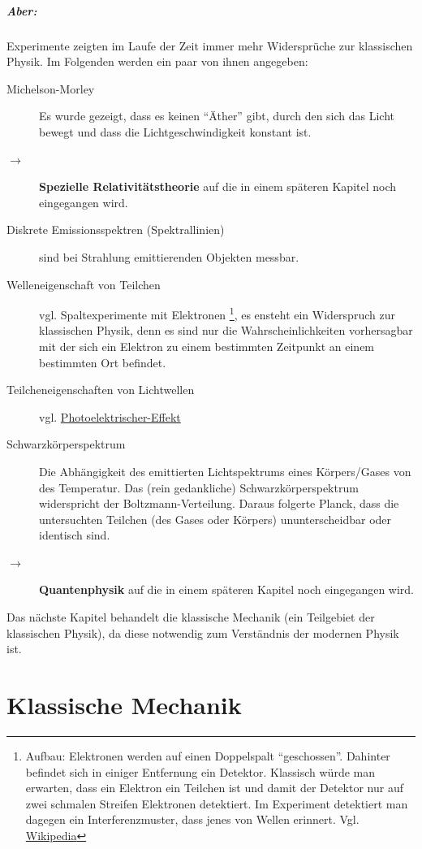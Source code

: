 \documentclass[oneside]{book}
\theoremstyle{definition}
\newcommand{\conseq}{$\rightarrow$~}
\begin{document}
\paragraph{Aber:} Experimente zeigten im Laufe der Zeit immer mehr Widersprüche zur klassischen Physik. Im Folgenden werden ein paar von ihnen angegeben:
\begin{description}
	\item[Michelson-Morley] Es wurde gezeigt, dass es keinen "`Äther"' gibt, durch den sich das Licht bewegt und dass die Lichtgeschwindigkeit konstant ist.
	\item[\conseq] \textbf{Spezielle Relativitätstheorie} auf die in einem späteren Kapitel noch eingegangen wird.
	\item[Diskrete Emissionsspektren (Spektrallinien)] sind bei Strahlung emittierenden Objekten messbar.
	\item[Welleneigenschaft von Teilchen] vgl. Spaltexperimente mit Elektronen \footnote{Aufbau: Elektronen werden auf einen Doppelspalt "`geschossen"'. Dahinter befindet sich in einiger Entfernung ein Detektor. Klassisch würde man erwarten, dass ein Elektron ein Teilchen ist und damit der Detektor nur auf zwei schmalen Streifen Elektronen detektiert. Im Experiment detektiert man dagegen ein Interferenzmuster, dass jenes von Wellen erinnert. Vgl. \href{http://de.wikipedia.org/wiki/Doppelspaltexperiment}{Wikipedia}}, es ensteht ein Widerspruch zur klassischen Physik, denn es sind nur die Wahrscheinlichkeiten vorhersagbar mit der sich ein Elektron zu einem bestimmten Zeitpunkt an einem bestimmten Ort befindet.
	\item[Teilcheneigenschaften von Lichtwellen] vgl. \href{http://de.wikipedia.org/wiki/Photoelektrischer_Effekt}{Photoelektrischer-Effekt}
	\item[Schwarzkörperspektrum] Die Abhängigkeit des emittierten Lichtspektrums eines Körpers/Gases von des Temperatur. Das (rein gedankliche) Schwarzkörperspektrum widerspricht der Boltzmann-Verteilung. Daraus folgerte Planck, dass die untersuchten Teilchen (des Gases oder Körpers) ununterscheidbar oder identisch sind.
	\item[\conseq] \textbf{Quantenphysik} auf die in einem späteren Kapitel noch eingegangen wird.
\end{description}
Das nächste Kapitel behandelt die klassische Mechanik (ein Teilgebiet der klassischen Physik), da diese notwendig zum Verständnis der modernen Physik ist.

\chapter{Klassische Mechanik}
\end{document}
